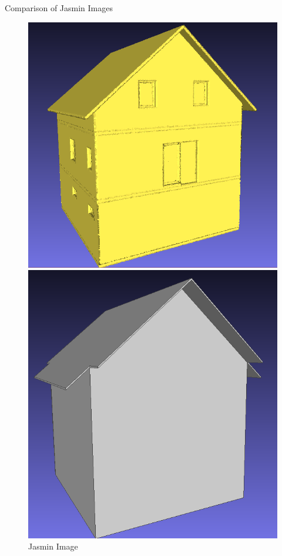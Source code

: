 \documentclass[10pt]{beamer}
\begin{document}
\begin{frame}{Comparison of Jasmin Images}
    \begin{figure}
      \centering
      \begin{minipage}[b]{0.48\textwidth}
        \centering
        \includegraphics[width=\textwidth]{../image/jasmin_ply.png}
        \caption{Jasmin Ply}
      \end{minipage}\hfill
      \begin{minipage}[b]{0.48\textwidth}
        \centering
        \includegraphics[width=\textwidth]{../image/jasmin.png}
        \caption{Jasmin Image}
      \end{minipage}
    \end{figure}
    \end{frame}
\end{document}
